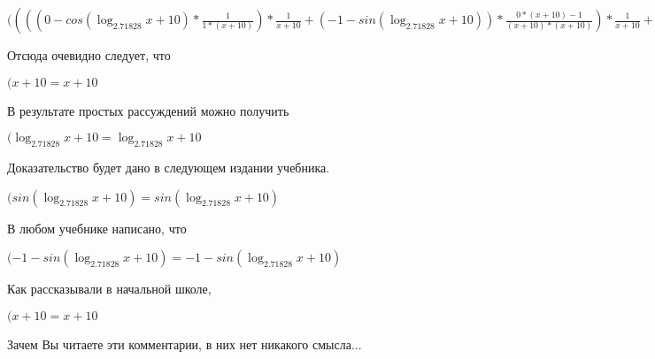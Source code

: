 \documentclass[12pt,a4paper,fleqn]{article}
\theoremstyle{definition}
\begin{document}
$(((( 0  - cos(\log_{ 2.71828 }{ x  +  10 }) * \frac{ 1 }{ 1  * ( x  +  10 )}
) * \frac{ 1 }{ x  +  10 }
 + ( -1  - sin(\log_{ 2.71828 }{ x  +  10 })) * \frac{ 0  * ( x  +  10 ) -  1 }{( x  +  10 ) * ( x  +  10 )}
) * \frac{ 1 }{ x  +  10 }
 + ( -1  - sin(\log_{ 2.71828 }{ x  +  10 })) * \frac{ 1 }{ x  +  10 }
 * \frac{ 0  * ( x  +  10 ) -  1 }{( x  +  10 ) * ( x  +  10 )}
 + ( -1  - sin(\log_{ 2.71828 }{ x  +  10 })) * \frac{ 1 }{ 1  * ( x  +  10 )}
 * \frac{ -2 }{( x  +  10 ) * ( x  +  10 )}
 + cos(\log_{ 2.71828 }{ x  +  10 }) * \frac{ 0  * ( x  +  10 ) * ( x  +  10 ) -  -2  * ( 1  * ( x  +  10 ) + ( x  +  10 ) *  1 )}{( x  +  10 ) * ( x  +  10 ) * ( x  +  10 ) * ( x  +  10 )}
) * cos(\log_{ 2.71828 }{ x  +  10 }) * \frac{ 1 }{ x  +  10 }
 * { 3 }^{sin(\log_{ 2.71828 }{ x  +  10 })} = ((( 0  - cos(\log_{ 2.71828 }{ x  +  10 }) * \frac{ 1 }{ 1  * ( x  +  10 )}
) * \frac{ 1 }{ x  +  10 }
 + ( -1  - sin(\log_{ 2.71828 }{ x  +  10 })) * \frac{ 0  * ( x  +  10 ) -  1 }{( x  +  10 ) * ( x  +  10 )}
) * \frac{ 1 }{ x  +  10 }
 + ( -1  - sin(\log_{ 2.71828 }{ x  +  10 })) * \frac{ 1 }{ x  +  10 }
 * \frac{ 0  * ( x  +  10 ) -  1 }{( x  +  10 ) * ( x  +  10 )}
 + ( -1  - sin(\log_{ 2.71828 }{ x  +  10 })) * \frac{ 1 }{ 1  * ( x  +  10 )}
 * \frac{ -2 }{( x  +  10 ) * ( x  +  10 )}
 + cos(\log_{ 2.71828 }{ x  +  10 }) * \frac{ 0  * ( x  +  10 ) * ( x  +  10 ) -  -2  * ( 1  * ( x  +  10 ) + ( x  +  10 ) *  1 )}{( x  +  10 ) * ( x  +  10 ) * ( x  +  10 ) * ( x  +  10 )}
) * cos(\log_{ 2.71828 }{ x  +  10 }) * \frac{ 1 }{ x  +  10 }
 * { 3 }^{sin(\log_{ 2.71828 }{ x  +  10 })}$

Отсюда очевидно следует, что

$( x  +  10  =  x  +  10 $

В результате простых рассуждений можно получить

$(\log_{ 2.71828 }{ x  +  10 } = \log_{ 2.71828 }{ x  +  10 }$

Доказательство будет дано в следующем издании учебника.

$(sin(\log_{ 2.71828 }{ x  +  10 }) = sin(\log_{ 2.71828 }{ x  +  10 })$

В любом учебнике написано, что

$( -1  - sin(\log_{ 2.71828 }{ x  +  10 }) =  -1  - sin(\log_{ 2.71828 }{ x  +  10 })$

Как рассказывали в начальной школе,

$( x  +  10  =  x  +  10 $

Зачем Вы читаете эти комментарии, в них нет никакого смысла...
\end{document}
